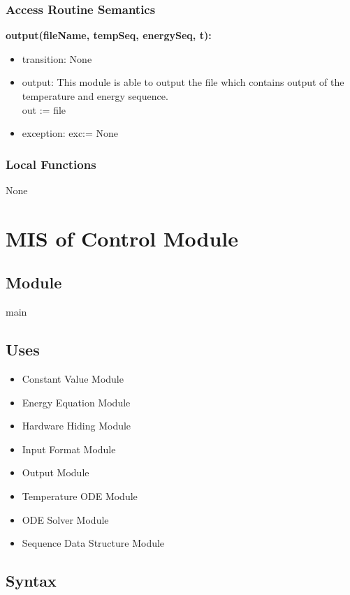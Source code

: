 \documentclass[12pt, titlepage]{article}
\begin{document}
\subsubsection{Access Routine Semantics}

\noindent \textbf{output(fileName, tempSeq, energySeq, t):}
\begin{itemize}
\item transition: None 
\item output: This module is able to output the file which contains output of the temperature and energy sequence.\\  
out := file
\item exception: exc:= None 
\end{itemize}

\subsubsection{Local Functions}

None

\newpage
\section{MIS of Control Module} \label{SCEC_Control_Module} 

\subsection{Module}

main 

\subsection{Uses}

\begin{itemize}
    \item Constant Value Module
    \item Energy Equation Module
    \item Hardware Hiding Module
    \item Input Format Module 
    \item Output Module 
    \item Temperature ODE Module
    \item ODE Solver Module
    \item Sequence Data Structure Module
\end{itemize}

\subsection{Syntax}
\end{document}
